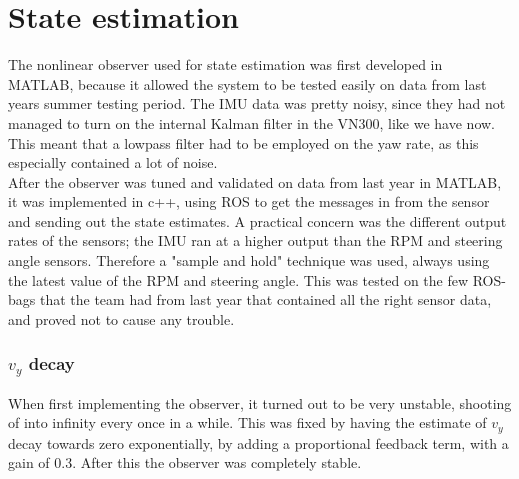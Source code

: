 \section{State estimation}

The nonlinear observer used for state estimation was first developed in MATLAB, because it allowed the system to be tested easily on data from last years summer testing period. The IMU data was pretty noisy, since they had not managed to turn on the internal Kalman filter in the VN300, like we have now. This meant that a lowpass filter had to be employed on the yaw rate, as this especially contained a lot of noise. \\

After the observer was tuned and validated on data from last year in MATLAB, it was implemented in c++, using ROS to get the messages in from the sensor and sending out the state estimates. A practical concern was the different output rates of the sensors; the IMU ran at a higher output than the RPM and steering angle sensors. Therefore a "sample and hold" technique was used, always using the latest value of the RPM and steering angle. This was tested on the few ROS-bags that the team had from last year that contained all the right sensor data, and proved not to cause any trouble.  \\

\subsubsection{$v_y$ decay}

When first implementing the observer, it turned out to be very unstable, shooting of into infinity every once in a while. This was fixed by having the estimate of $v_y$ decay towards zero exponentially, by adding a proportional feedback term, with a gain of $0.3$. After this the observer was completely stable.